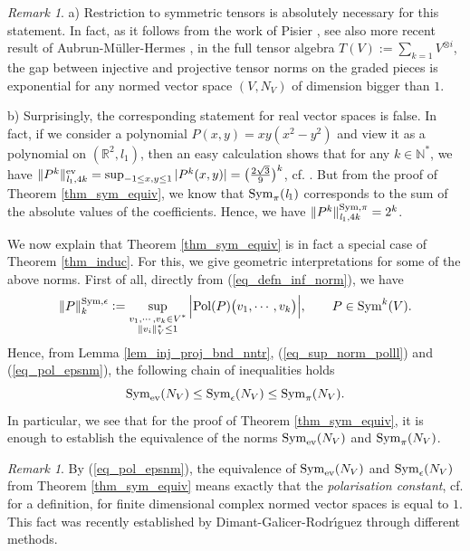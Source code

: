 \documentclass[12pt]{article}
\numberwithin{equation}{section}
\theoremstyle{theorem}
\theoremstyle{definition}
\theoremstyle{remark}
\newtheorem{rem}[thm]{Remark}
\newcommand{\sym}{{\rm{Sym}}}
\newcommand{\nat}{\mathbb{N}}
\begin{document}
	\begin{rem}\label{rem_sym_equiv}
		a) Restriction to symmetric tensors is absolutely necessary for this statement. In fact, as it follows from the work of Pisier \cite[Théorème 3.1]{PisierDecart}, see also more recent result of Aubrun-M{\"u}ller-Hermes \cite[Theorem 1.1]{AuburnMull}, in the full tensor algebra $T(V) := \sum_{k = 1} V^{\otimes i}$, the gap between injective and projective tensor norms on the graded pieces is exponential for any normed vector space $(V, N_V)$ of dimension bigger than $1$. 
		\par 
		b) Surprisingly, the corresponding statement for real vector spaces is false.
		In fact, if we consider a polynomial $P(x, y) = xy(x^2 - y^2)$ and view it as a polynomial on $(\mathbb{R}^2, \textit{l}_1)$, then an easy calculation shows that for any $k \in \nat^*$, we have $\| P^k \|^{{\rm{ev}}}_{\textit{l}_1, 4k} = \sup_{-1 \leq x, y \leq 1} |P^k(x, y)| = \big( \frac{2 \sqrt{3}}{9} \big)^k$, cf. \cite[proof of Theorem 4.2]{RealBohnHil}. 
		But from the proof of Theorem \ref{thm_sym_equiv}, we know that $\sym_{\pi}(\textit{l}_1)$ corresponds to the sum of the absolute values of the coefficients.
		Hence, we have $\| P^k \|^{\sym, \pi}_{\textit{l}_1, 4k} = 2^k$.
	\end{rem}
	\par 
	We now explain that Theorem \ref{thm_sym_equiv} is in fact a special case of Theorem \ref{thm_induc}.
	For this, we give geometric interpretations for some of the above norms. 
	First of all, directly from (\ref{eq_defn_inf_norm}), we have
	\begin{equation}\label{eq_pol_epsnm}
		\| P \|^{\sym, \epsilon}_{k}
		:=
		\sup_{\substack{v_1, \cdots, v_k \in V^* \\ \| v_i \|_V^* \leq 1}} \Big| {\rm{Pol}}(P) \big(v_1, \cdots, v_k \big) \Big|, 
		\qquad
		P \in \sym^k(V).
	\end{equation}
	Hence, from Lemma \ref{lem_inj_proj_bnd_nntr}, (\ref{eq_sup_norm_polll}) and (\ref{eq_pol_epsnm}), the following chain of inequalities holds
	\begin{equation}\label{eq_compar_3_nmrs}
		\sym_{{\rm{ev}}}(N_V) \leq \sym_{\epsilon}(N_V) \leq \sym_{\pi}(N_V).
	\end{equation}
	In particular, we see that for the proof of Theorem \ref{thm_sym_equiv}, it is enough to establish the equivalence of the norms $\sym_{{\rm{ev}}}(N_V)$ and $\sym_{\pi}(N_V)$.
	\begin{sloppypar}
	\begin{rem}	
		By (\ref{eq_pol_epsnm}), the equivalence of $\sym_{{\rm{ev}}}(N_V)$ and $\sym_{\epsilon}(N_V)$ from Theorem \ref{thm_sym_equiv} means exactly that the \textit{polarisation constant}, cf. \cite[(4)]{PolarConst} for a definition, for finite dimensional complex normed vector spaces is equal to $1$.
		This fact was recently established by Dimant-Galicer-Rodr{\'{\i}}guez \cite[Theorem 1.1]{PolarConst} through different methods.
	\end{rem}
	\end{sloppypar}
\end{document}
